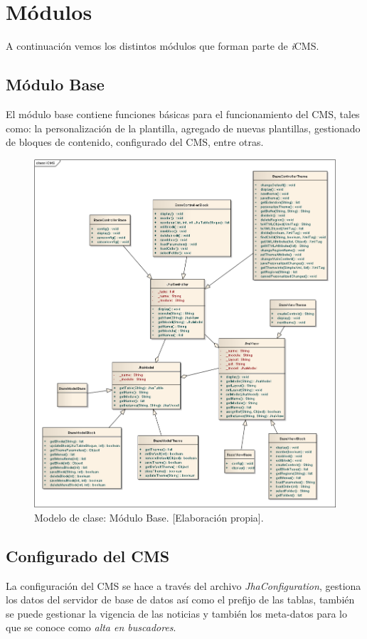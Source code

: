 \section{M\'odulos}
A continuaci\'on vemos los distintos m\'odulos que forman parte de \textit{i}CMS.

\subsection{M\'odulo Base}
El m\'odulo base contiene funciones b\'asicas para el funcionamiento del CMS, tales como: la personalizaci\'on de la plantilla, agregado de nuevas plantillas, gestionado de bloques de contenido, configurado del CMS, entre otras.

\begin{figure}[h]
\centering
\includegraphics[scale=.35, keepaspectratio=true]{imagenes/13_imagen.png}
\caption{Modelo de clase: M\'odulo Base. [Elaboraci\'on propia].}
\end{figure}

\subsection{Configurado del CMS}
La configuraci\'on del CMS se hace a trav\'es del archivo \textit{JhaConfiguration}, gestiona los datos del servidor de base de datos as\'i como el prefijo de las tablas, tambi\'en se puede gestionar la vigencia de las noticias y tambi\'en los meta-datos para lo que se conoce como \textit{alta en buscadores}.

